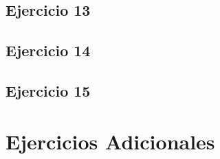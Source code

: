 \documentclass[12pt]{article}
\begin{document}
\subsection{Ejercicio 13}

\subsection{Ejercicio 14}

\subsection{Ejercicio 15}


\section{Ejercicios Adicionales}
\end{document}
